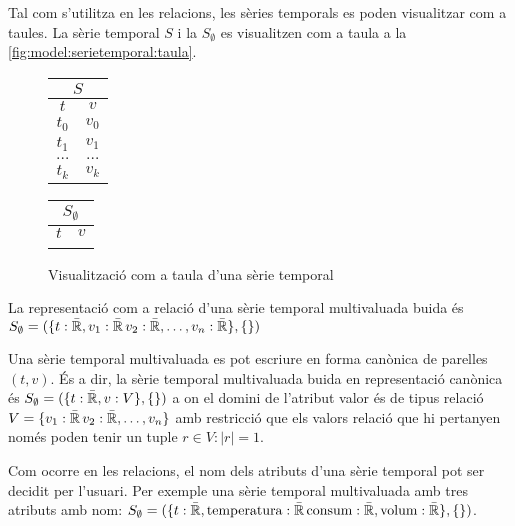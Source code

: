Tal com s'utilitza en les relacions, les sèries temporals es poden
visualitzar com a taules. La sèrie temporal $S$ i la $S_{\emptyset}$
es visualitzen com a taula a la
\autoref{fig:model:serietemporal:taula}.

\begin{figure}[tp]
  \centering
  \begin{tabular}[c]{|c|c|}
    \multicolumn{2}{c}{$S$} \\ \hline
    $t$  & $v$ \\ \hline
    $t_0$  & $v_0$ \\
    $t_1$  & $v_1$ \\
    $\dots$  & $\dots$ \\ 
    $t_k$  & $v_k$ \\ \hline
  \end{tabular} \qquad
  \begin{tabular}[c]{|c|c|}
    \multicolumn{2}{c}{$S_{\emptyset}$} \\ \hline
    $t$  & $v$ \\ \hline
      &  \\ \hline
  \end{tabular}
  \caption{Visualització com a taula d'una sèrie temporal}
  \label{fig:model:serietemporal:taula}
\end{figure}




\begin{definition}
  La representació com a relació d'una sèrie temporal multivaluada buida és
  $S_{\emptyset} = ( \{t: \bar{\mathbb{R}{}}, v_1: \bar{\mathbb{R}{}}\,
  v_2: \bar{\mathbb{R}{}}, \dotsc, v_n: \bar{\mathbb{R}{}}\}, \{ \} )$

  Una sèrie temporal multivaluada es pot escriure en forma canònica de
  parelles $(t,v)$. És a dir, la sèrie temporal multivaluada buida en
  representació canònica és $S_{\emptyset} = ( \{t: \bar{\mathbb{R}{}},
  v: V \}, \{ \} )$ a on el domini de l'atribut valor és de tipus
  relació $V = \{ v_1: \bar{\mathbb{R}{}}\, v_2: \bar{\mathbb{R}{}},
  \dotsc, v_n \}$ amb restricció que els valors relació que hi
  pertanyen només poden tenir un tuple $r \in V: |r| = 1$.
\end{definition}

Com ocorre en les relacions, el nom dels atributs d'una sèrie
temporal pot ser decidit per l'usuari. Per exemple una sèrie temporal
multivaluada amb tres atributs amb nom: $S_{\emptyset} = ( \{t:
\bar{\mathbb{R}{}}, \text{temperatura}: \bar{\mathbb{R}{}}\,
\text{consum}: \bar{\mathbb{R}{}}, \text{volum}: \bar{\mathbb{R}{}}\}, \{
\} )$.


